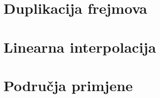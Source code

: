 \section{Duplikacija frejmova}
\lipsum[10]

\section{Linearna interpolacija}
\lipsum[11-12]

\section{Podru\v{c}ja primjene}
\lipsum[13]